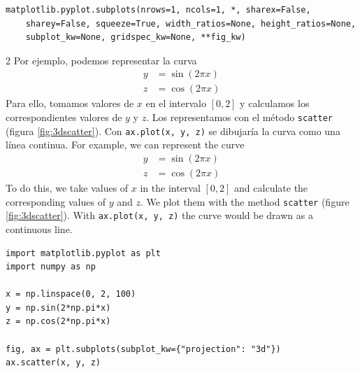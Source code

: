 \begin{verbatim}
matplotlib.pyplot.subplots(nrows=1, ncols=1, *, sharex=False,
    sharey=False, squeeze=True, width_ratios=None, height_ratios=None,
    subplot_kw=None, gridspec_kw=None, **fig_kw)
\end{verbatim}
\begin{paracol}{2}
Por ejemplo, podemos representar la curva
\begin{align*}
y&=\sin(2\pi x)\\
z&=\cos(2\pi x)
\end{align*}
Para ello, tomamos valores de $x$ en el intervalo $[0,2]$ y calculamos los correspondientes valores de $y$ y $z$. Los representamos con el método \texttt{scatter} (figura \ref{fig:3dscatter}). Con \texttt{ax.plot(x, y, z)} se dibujaría la curva como una línea continua.
\switchcolumn
For example, we can represent the curve
\begin{align*}
y&=\sin(2\pi x)\\
z&=\cos(2\pi x)
\end{align*}
To do this, we take values of $x$ in the interval $[0,2]$ and calculate the corresponding values of $y$ and $z$. We plot them with the method \texttt{scatter} (figure \ref{fig:3dscatter}). With \texttt{ax.plot(x, y, z)} the curve would be drawn as a continuous line.
\end{paracol}

\begin{verbatim}
import matplotlib.pyplot as plt
import numpy as np

x = np.linspace(0, 2, 100)
y = np.sin(2*np.pi*x)
z = np.cos(2*np.pi*x)

fig, ax = plt.subplots(subplot_kw={"projection": "3d"})
ax.scatter(x, y, z)
\end{verbatim}

